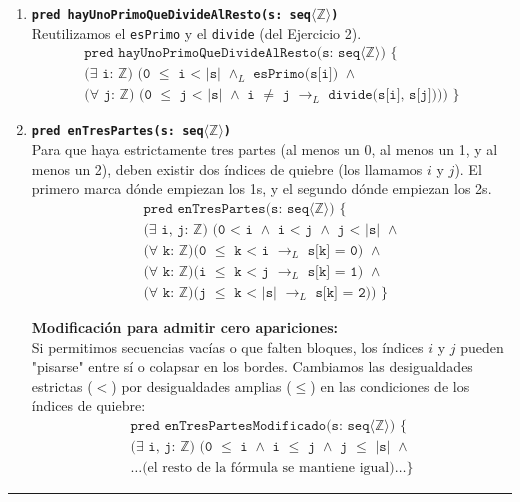 \begin{enumerate}[label=\textbf{\alph*)}]
    \vspace{0.4cm}
    \item \textbf{\texttt{pred hayUnoPrimoQueDivideAlResto(s: seq$\langle\mathbb{Z}\rangle$)}} \\
    Reutilizamos el \texttt{esPrimo} y el \texttt{divide} (del Ejercicio 2).
    \begin{multline*}
    \texttt{pred hayUnoPrimoQueDivideAlResto(s: seq$\langle\mathbb{Z}\rangle$) \{} \\
    \texttt{($\exists$ i: $\mathbb{Z}$) (0 $\leq$ i < |s| $\wedge_L$ esPrimo(s[i]) $\wedge$} \\
    \texttt{($\forall$ j: $\mathbb{Z}$) (0 $\leq$ j < |s| $\wedge$ i $\neq$ j $\rightarrow_L$ divide(s[i], s[j]))) \}}
    \end{multline*}

    \vspace{0.4cm}
    \item \textbf{\texttt{pred enTresPartes(s: seq$\langle\mathbb{Z}\rangle$)}} \\
    Para que haya estrictamente tres partes (al menos un 0, al menos un 1, y al menos un 2), deben existir dos índices de quiebre (los llamamos $i$ y $j$). El primero marca dónde empiezan los 1s, y el segundo dónde empiezan los 2s.
    \begin{multline*}
    \texttt{pred enTresPartes(s: seq$\langle\mathbb{Z}\rangle$) \{} \\
    \texttt{($\exists$ i, j: $\mathbb{Z}$) (0 < i $\wedge$ i < j $\wedge$ j < |s| $\wedge$} \\
    \texttt{($\forall$ k: $\mathbb{Z}$)(0 $\leq$ k < i $\rightarrow_L$ s[k] = 0) $\wedge$} \\
    \texttt{($\forall$ k: $\mathbb{Z}$)(i $\leq$ k < j $\rightarrow_L$ s[k] = 1) $\wedge$} \\
    \texttt{($\forall$ k: $\mathbb{Z}$)(j $\leq$ k < |s| $\rightarrow_L$ s[k] = 2)) \}}
    \end{multline*}
    
    \textbf{Modificación para admitir cero apariciones:} \\
    Si permitimos secuencias vacías o que falten bloques, los índices $i$ y $j$ pueden "pisarse" entre sí o colapsar en los bordes. Cambiamos las desigualdades estrictas ($<$) por desigualdades amplias ($\leq$) en las condiciones de los índices de quiebre:
    \begin{multline*}
    \texttt{pred enTresPartesModificado(s: seq$\langle\mathbb{Z}\rangle$) \{} \\
    \texttt{($\exists$ i, j: $\mathbb{Z}$) (0 $\leq$ i $\wedge$ i $\leq$ j $\wedge$ j $\leq$ |s| $\wedge$} \\
    \dots \text{(el resto de la fórmula se mantiene igual)} \dots \texttt{\}}
    \end{multline*}

\end{enumerate}

\vspace{0.5cm}
\hrule
\vspace{0.5cm}
